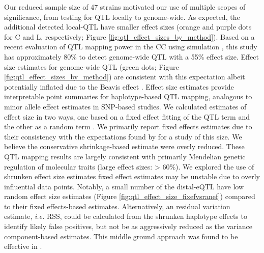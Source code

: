 \documentclass[9pt,twocolumn,twoside]{gsajnl}
\newcommand{\ie}{\emph{i.e.}\xspace}
\newcommand{\WV}[2]{\textcolor{red}{#1\footnote{\textcolor{red}{WV: #2}}}}
\begin{document}
Our reduced sample size of 47 strains motivated our use of multiple scopes of significance, from testing for QTL locally to genome-wide. As expected, the additional detected local-QTL have smaller effect sizes (orange and purple dots for C and L, respectively; Figure \ref{fig:qtl_effect_sizes_by_method}). Based on a recent evaluation of QTL mapping power in the CC using simulation \citep{Keele2019}, this study has approximately 80\% to detect genome-wide QTL with a 55\% effect size. Effect size estimates for genome-wide QTL (green dots; Figure \ref{fig:qtl_effect_sizes_by_method}) are consistent with this expectation albeit potentially inflated due to the Beavis effect \citep{Xu2003}. 
Effect size estimates provide interpretable point summaries for haplotype-based QTL mapping, analogous to minor allele effect estimates in SNP-based studies. We calculated estimates of effect size in two ways, one based on a fixed effect fitting of the QTL term and the other as a random term \citep{Wei2016}. 
We primarily report fixed effects estimates due to their consistency with the expectations found by \cite{Keele2019} for a study of this size. We believe the conservative shrinkage-based estimate were overly reduced. These QTL mapping results are largely consistent with primarily Mendelian genetic regulation of molecular traits (large effect sizes: > 60\%).
We explored the use of shrunken effect size estimates fixed effect estimates may be unstable due to overly influential data points. Notably, a small number of the distal-eQTL have low random effect size estimates (Figure \ref{fig:qtl_effect_size_fixefvsranef}) compared to their fixed effects-based estimates. Alternatively, an residual variation estimate, \ie RSS, could be calculated from the shrunken haplotype effects to identify likely false positives, but not be as aggressively reduced as the variance component-based estimates. This middle ground approach was found to be effective in \cite{Keele2018}.
\end{document}
